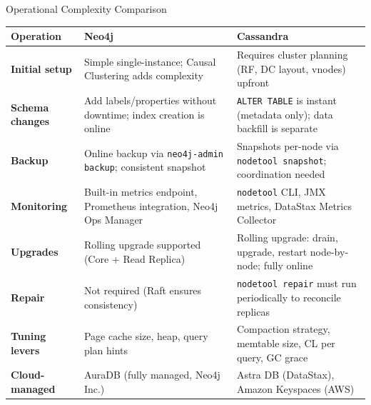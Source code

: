\documentclass[aspectratio=169]{beamer}
\begin{document}
\begin{frame}{Operational Complexity Comparison}
  \scriptsize
  \renewcommand{\arraystretch}{1.5}
  \begin{tabular}{>{\bfseries}p{2.8cm} p{4.5cm} p{4.5cm}}
    \toprule
    \textbf{Operation} & \textbf{\textcolor{neo4jGreen}{Neo4j}} & \textbf{\textcolor{cassBlue}{Cassandra}} \\
    \midrule
    Initial setup & Simple single-instance; Causal Clustering adds complexity & Requires cluster planning (RF, DC layout, vnodes) upfront \\
    Schema changes & Add labels/properties without downtime; index creation is online & \texttt{ALTER TABLE} is instant (metadata only); data backfill is separate \\
    Backup & Online backup via \texttt{neo4j-admin backup}; consistent snapshot & Snapshots per-node via \texttt{nodetool snapshot}; coordination needed \\
    Monitoring & Built-in metrics endpoint, Prometheus integration, Neo4j Ops Manager & \texttt{nodetool} CLI, JMX metrics, DataStax Metrics Collector \\
    Upgrades & Rolling upgrade supported (Core + Read Replica) & Rolling upgrade: drain, upgrade, restart node-by-node; fully online \\
    Repair & Not required (Raft ensures consistency) & \texttt{nodetool repair} must run periodically to reconcile replicas \\
    Tuning levers & Page cache size, heap, query plan hints & Compaction strategy, memtable size, CL per query, GC grace \\
    Cloud-managed & AuraDB (fully managed, Neo4j Inc.) & Astra DB (DataStax), Amazon Keyspaces (AWS) \\
    \bottomrule
  \end{tabular}
\end{frame}
\end{document}
